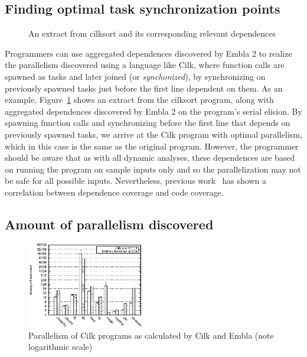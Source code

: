 \subsection{Finding optimal task synchronization points} \label{sresults:cilk-spawns}
\begin{figure}[t]
  \begin{center}
  \scriptsize
  
  \end{center}
  \caption{An extract from \textsf{cilksort} and its corresponding relevant dependences}
  \label{cilksort-depgraph}
\end{figure}

Programmers can use aggregated dependences discovered by Embla 2 to realize the parallelism discovered using a language like Cilk,
where function calls are spawned as tasks and later joined (or \emph{synchonized}),
by synchronizing on previously spawned tasks just before the first line dependent on them.
As an example, Figure~\ref{cilksort-depgraph} shows an extract from the \textsf{cilksort} program,
along with aggregated dependences discovered by Embla 2 on the program's serial elision.
By spawning function calls and synchronizing before the first line that depends on previously spawned tasks,
we arrive at the Cilk program with optimal parallelism, which in this case is the same as the original program.
However, the programmer should be aware that as with all dynamic analyses,
these dependences are based on running the program on sample inputs only and so the parallelization may not be safe for all possible inputs.
Nevertheless, previous work~\cite{embla:08} has shown a correlation between dependence coverage and code coverage.

\subsection{Amount of parallelism discovered} \label{sresults:cilk-limits}
\begin{figure}[t]
 \centering
 \includegraphics[width=2.0in]{cilk-run}
 \caption{Parallelism of Cilk programs as calculated by Cilk and Embla (note logarithmic scale)}
 \label{cilk-run}
\end{figure}

